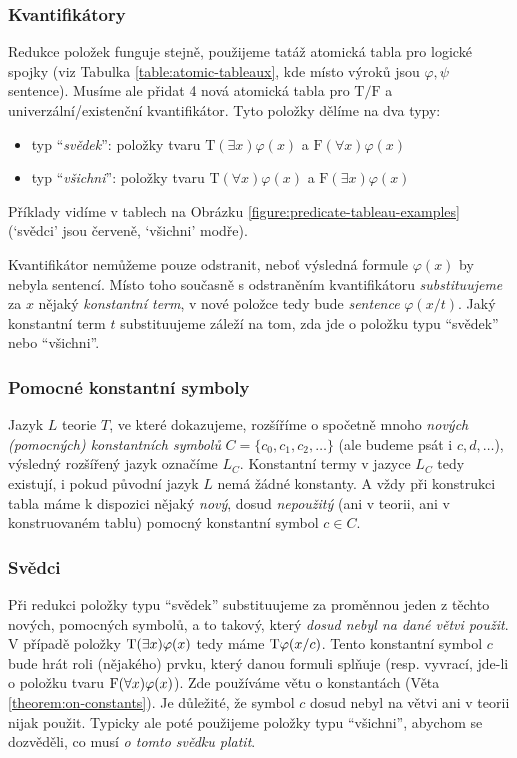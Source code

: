 \subsubsection{Kvantifikátory}
Redukce položek funguje stejně, použijeme tatáž atomická tabla pro logické spojky (viz Tabulka \ref{table:atomic-tableaux}, kde místo výroků jsou $\varphi,\psi$ sentence). Musíme ale přidat 4 nová atomická tabla pro $\mathrm T/\mathrm F$ a univerzální/existenční kvantifikátor. Tyto položky dělíme na dva typy:
\begin{itemize}
    \item typ ``\emph{svědek}'': položky tvaru $\mathrm{T}(\exists x)\varphi(x)$ a $\mathrm{F}(\forall x)\varphi(x)$
    \item typ ``\emph{všichni}'': položky tvaru $\mathrm{T}(\forall x)\varphi(x)$ a $\mathrm{F}(\exists x)\varphi(x)$    
\end{itemize}
Příklady vidíme v tablech na Obrázku \ref{figure:predicate-tableau-examples} (`svědci' jsou červeně, `všichni' modře).

Kvantifikátor nemůžeme pouze odstranit, neboť výsledná formule $\varphi(x)$ by nebyla sentencí. Místo toho současně s odstraněním kvantifikátoru \emph{substituujeme} za $x$ nějaký \emph{konstantní term}, v nové položce tedy bude \emph{sentence} $\varphi(x/t)$. Jaký konstantní term $t$ substituujeme záleží na tom, zda jde o položku typu ``svědek'' nebo ``všichni''. 

\subsubsection{Pomocné konstantní symboly}
Jazyk $L$ teorie $T$, ve které dokazujeme, rozšíříme o spočetně mnoho \emph{nových (pomocných) konstantních symbolů} $C=\{c_0,c_1,c_2,\dots\}$ (ale budeme psát i $c,d,\dots$), výsledný rozšířený jazyk označíme $L_C$. Konstantní termy v jazyce $L_C$ tedy existují, i pokud původní jazyk $L$ nemá žádné konstanty. A vždy při konstrukci tabla máme k dispozici nějaký \emph{nový}, dosud \emph{nepoužitý} (ani v teorii, ani v konstruovaném tablu) pomocný konstantní symbol $c\in C$.

\subsubsection{Svědci}
Při redukci položky typu ``svědek'' substituujeme za proměnnou jeden z těchto nových, pomocných symbolů, a to takový, který \emph{dosud nebyl na dané větvi použit}. V případě položky $\mathrm{T}(\exists x)\varphi(x)$ tedy máme $\mathrm{T}\varphi(x/c)$. Tento konstantní symbol $c$ bude hrát roli (nějakého) prvku, který danou formuli splňuje (resp. vyvrací, jde-li o položku tvaru $\mathrm{F}(\forall x)\varphi(x)$). Zde používáme větu o konstantách (Věta \ref{theorem:on-constants}). Je důležité, že symbol $c$ dosud nebyl na větvi ani v teorii nijak použit. Typicky ale poté použijeme položky typu ``všichni'', abychom se dozvěděli, co musí \emph{o tomto svědku platit}.

